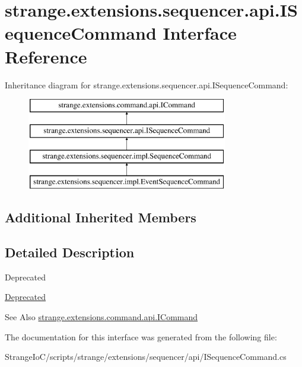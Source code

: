 \hypertarget{interfacestrange_1_1extensions_1_1sequencer_1_1api_1_1_i_sequence_command}{\section{strange.\-extensions.\-sequencer.\-api.\-I\-Sequence\-Command Interface Reference}
\label{interfacestrange_1_1extensions_1_1sequencer_1_1api_1_1_i_sequence_command}
}
Inheritance diagram for strange.\-extensions.\-sequencer.\-api.\-I\-Sequence\-Command\-:\begin{figure}[H]
\begin{center}
\leavevmode
\includegraphics[height=4.000000cm]{interfacestrange_1_1extensions_1_1sequencer_1_1api_1_1_i_sequence_command}
\end{center}
\end{figure}
\subsection*{Additional Inherited Members}


\subsection{Detailed Description}
\begin{DoxyRefDesc}{Deprecated}
\item[\hyperlink{deprecated__deprecated000002}{Deprecated}]\end{DoxyRefDesc}


\begin{DoxySeeAlso}{See Also}
\hyperlink{interfacestrange_1_1extensions_1_1command_1_1api_1_1_i_command}{strange.\-extensions.\-command.\-api.\-I\-Command} 
\end{DoxySeeAlso}


The documentation for this interface was generated from the following file\-:\begin{DoxyCompactItemize}
\item 
Strange\-Io\-C/scripts/strange/extensions/sequencer/api/I\-Sequence\-Command.\-cs\end{DoxyCompactItemize}
